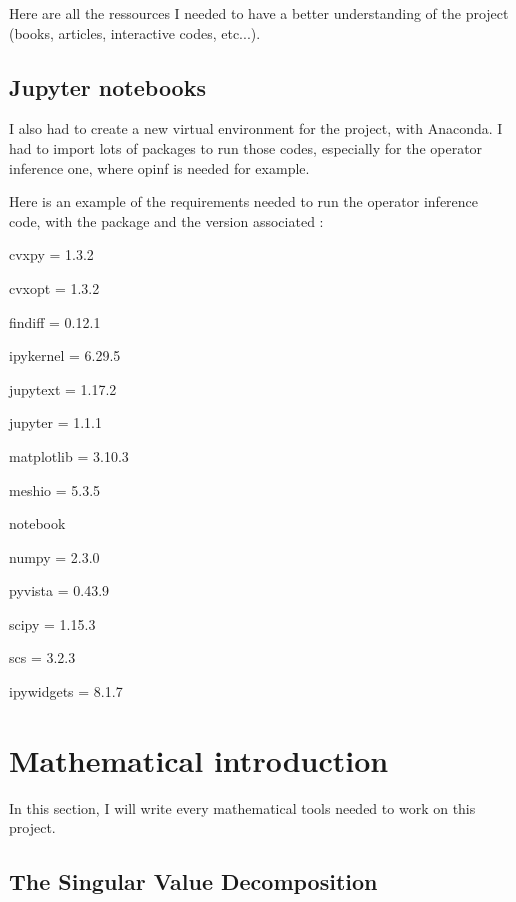 \documentclass{article}
\begin{document}
Here are all the ressources I needed to have a better understanding of the project (books, articles, interactive codes, etc...).

\vspace{1cm}


\subsection{Jupyter notebooks}

\vspace{1cm}

I also had to create a new virtual environment for the project, with Anaconda. I had to import lots of packages to run those codes, especially for the operator inference one, where opinf is needed for example.

Here is an example of the requirements needed to run the operator inference code, with the package and the version associated : 

cvxpy = 1.3.2 

cvxopt = 1.3.2

findiff = 0.12.1

ipykernel = 6.29.5

jupytext = 1.17.2

jupyter = 1.1.1 

matplotlib = 3.10.3

meshio = 5.3.5

notebook

numpy = 2.3.0

pyvista = 0.43.9

scipy = 1.15.3

scs = 3.2.3

ipywidgets = 8.1.7


\vspace{1cm}

\section{Mathematical introduction}

\vspace{1cm}

In this section, I will write every mathematical tools needed to work on this project.

\vspace{1cm}

\subsection{The Singular Value Decomposition}
\end{document}
